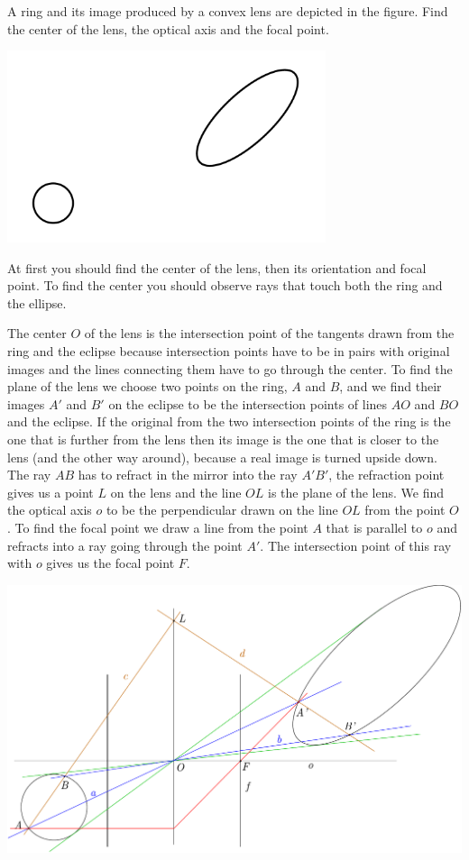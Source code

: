 {\ifEngStatement
A ring and its image produced by a convex lens are depicted in the figure. Find the center of the lens, the optical axis and the focal point.
\begin{center}
\includegraphics[width=0.7\textwidth]{2015-v3g-07-ringjaellips}%
\end{center}
\fi


\ifEngHint
At first you should find the center of the lens, then its orientation and focal point. To find the center you should observe rays that touch both the ring and the ellipse.
\fi


\ifEngSolution
The center $O$ of the lens is the intersection point of the tangents drawn from the ring and the eclipse because intersection points have to be in pairs with original images and the lines connecting them have to go through the center. To find the plane of the lens we choose two points on the ring, $A$ and $B$, and we find their images $A'$ and $B'$ on the eclipse to be the intersection points of lines $AO$ and $BO$ and the eclipse. If the original from the two intersection points of the ring is the one that is further from the lens then its image is the one that is closer to the lens (and the other way around), because a real image is turned upside down. The ray $AB$ has to refract in the mirror into the ray $A'B'$, the refraction point gives us a point $L$ on the lens and the line $OL$ is the plane of the lens. We find the optical axis $o$ to be the perpendicular drawn on the line $OL$ from the point $O$. To find the focal point we draw a line from the point $A$ that is parallel to $o$ and refracts into a ray going through the point $A'$. The intersection point of this ray with $o$ gives us the focal point $F$.
\begin{center}
\includegraphics[width=\textwidth]{2015-v3g-07-ellips_lah}
\end{center}
\fi
}